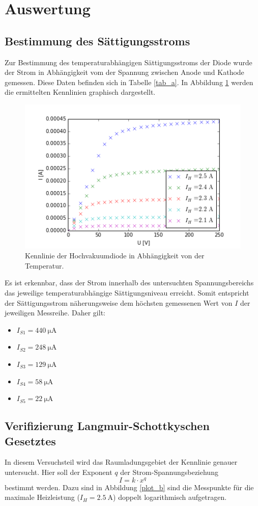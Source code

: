\documentclass[11pt,ngerman,a4paper]{article}
\begin{document}
\section{Auswertung}
\subsection{Bestimmung des Sättigungsstroms}
Zur Bestimmung des temperaturabhängigen Sättigungsstroms der Diode wurde der Strom in Abhängigkeit vom der Spannung zwischen Anode und Kathode gemessen. Diese Daten befinden sich in Tabelle \ref{tab_a}. In Abbildung \ref{abb_a} werden die ermittelten Kennlinien graphisch dargestellt. 
\begin{figure}[htp]
\centering
\includegraphics[scale=0.8]{plot_a.png}
\caption{Kennlinie der Hochvakuumdiode in Abhängigkeit von der Temperatur.}
\label{abb_a}
\end{figure}

\noindent
Es ist erkennbar, dass der Strom innerhalb des untersuchten Spannungsbereichs das jeweilige temperaturabhängige Sättigungsniveau erreicht. Somit entspricht der Sättigungsstrom näherungsweise dem höchsten gemessenen Wert von $I$ der jeweiligen Messreihe. Daher gilt:
\begin{itemize}
\item $I_{S1} = \SI{440}{\micro\ampere}$
\item $I_{S2} = \SI{248}{\micro\ampere}$
\item $I_{S3} = \SI{129}{\micro\ampere}$
\item $I_{S4} = \SI{58}{\micro\ampere}$
\item $I_{S5} = \SI{22}{\micro\ampere}$
\end{itemize}

\subsection{Verifizierung Langmuir-Schottkyschen Gesetztes}
In diesem Versuchsteil wird das Raumladungsgebiet der Kennlinie genauer untersucht.
Hier soll der Exponent $q$ der Strom-Spannungsbeziehung 
\[
I = k\cdot x^q
\]
bestimmt werden. Dazu sind in Abbildung \ref{plot_b} sind die Messpunkte für die maximale Heizleistung ($I_H = \SI{2.5}{\ampere}$) doppelt logarithmisch aufgetragen.
\end{document}

